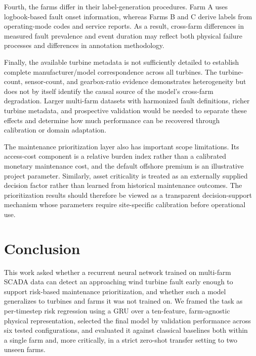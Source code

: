 \documentclass[conference]{IEEEtran}
\begin{document}
Fourth, the farms differ in their label-generation procedures. Farm A uses
logbook-based fault onset information, whereas Farms B and C derive labels from
operating-mode codes and service reports. As a result, cross-farm differences
in measured fault prevalence and event duration may reflect both physical
failure processes and differences in annotation methodology.

Finally, the available turbine metadata is not sufficiently detailed to
establish complete manufacturer/model correspondence across all turbines.
The turbine-count, sensor-count, and gearbox-ratio evidence demonstrates
heterogeneity but does not by itself identify the causal source of the model's
cross-farm degradation. Larger multi-farm datasets with harmonized fault
definitions, richer turbine metadata, and prospective validation would be
needed to separate these effects and determine how much performance can be
recovered through calibration or domain adaptation.

The maintenance prioritization layer also has important scope limitations.
Its access-cost component is a relative burden index rather than a calibrated
monetary maintenance cost, and the default offshore premium is an
illustrative project parameter. Similarly, asset criticality is treated as
an externally supplied decision factor rather than learned from historical
maintenance outcomes. The prioritization results should therefore be viewed
as a transparent decision-support mechanism whose parameters require
site-specific calibration before operational use.

\section{Conclusion}
This work asked whether a recurrent neural network trained on multi-farm
SCADA data can detect an approaching wind turbine fault early enough to
support risk-based maintenance prioritization, and whether such a model
generalizes to turbines and farms it was not trained on. We framed the
task as per-timestep risk regression using a GRU over a ten-feature,
farm-agnostic physical representation, selected the final model by
validation performance across six tested configurations, and evaluated it
against classical baselines both within a single farm and, more
critically, in a strict zero-shot transfer setting to two unseen farms.
 
\end{document}
